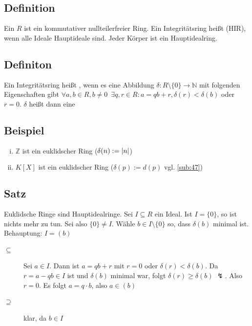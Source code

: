 \subsection[Definition Integritätsring und Hauptidealring]{Definition} %
\label{sub:98}
Ein  $R$ ist ein kommutativer nullteilerfreier Ring. Ein Integritätsring heißt  (HIR), wenn alle Ideale Hauptideale sind.  
Jeder Körper ist ein Hauptidealring.

\subsection[Definition: Euklidischer Ring und Gradfunktion]{Definiton} %
\label{sub:99}
Ein Integritätsring heißt , wenn es eine Abbildung $\delta : R \setminus \{0\} \to \mathds{N}$ mit folgenden Eigenschaften gibt 
$\forall a,b \in R, b \not= 0 \enspace\exists q,r \in R : a= qb +r , \delta (r) < \delta (b)$ oder $r =0$.
$\delta $ heißt dann eine  

\subsection[Beispiel für euklidische Ringe]{Beispiel} %
\label{sub:910}
\begin{enumerate}[(i)]
	\item $\mathds{Z}$ ist ein euklidscher Ring ($\delta (n) := \lvert n\rvert $)
	\item $K[X]$ ist ein euklidscher Ring ($\delta (p) := d(p)$ vgl. \ref{sub:47}) 
\end{enumerate}

\subsection[Satz: Euklidische Ringe sind Hauptidealringe]{Satz} %
\label{sub:911}
Euklidsche Ringe sind Hauptidealringe.
Sei $I \subseteq R$ ein Ideal. Ist $I= \{0\}$, so ist nichts mehr zu tun. Sei also $\{0\} \not= I$. Wähle $b \in I \setminus \{0\}$ so, dass $\delta (b)$ minimal ist.
Behauptung: $I= (b)$ 
\begin{description}
	\item[\glqq$\subseteq$\grqq] Sei $a \in I$. Dann ist $a = qb +r$ mit $r=0$ oder $\delta (r) < \delta (b)$. Da $r= a- qb \in I$ ist und $\delta (b)$ minimal war, folgt
	$\delta (r) \ge \delta (b)$ {\large $\lightning$}. Also $r=0$. Es folgt $a= q \cdot b$, also $a \in (b)$
	\item[\glqq$\supseteq $\grqq] klar, da $b \in I$ \bewende 
\end{description}

